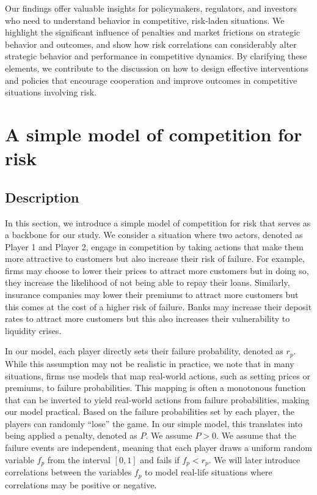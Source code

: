 \documentclass[preprint,12pt,authoryear]{elsarticle}
\theoremstyle{definition}
\begin{document}
Our findings offer valuable insights for policymakers, regulators, and investors who need to understand behavior in competitive, risk-laden situations. We highlight the significant influence of penalties and market frictions on strategic behavior and outcomes, and show how risk correlations can considerably alter strategic behavior and performance in competitive dynamics. By clarifying these elements, we contribute to the discussion on how to design effective interventions and policies that encourage cooperation and improve outcomes in competitive situations involving risk.

\section{A simple model of competition for risk}
\label{sec:simplemodel}
\subsection{Description}

In this section, we introduce a simple model of competition for risk that serves as a backbone for our study. We consider a situation where two actors, denoted as Player 1 and Player 2, engage in competition by taking actions that make them more attractive to customers but also increase their risk of failure. For example, firms may choose to lower their prices to attract more customers but in doing so, they increase the likelihood of not being able to repay their loans. Similarly, insurance companies may lower their premiums to attract more customers but this comes at the cost of a higher risk of failure. Banks may increase their deposit rates to attract more customers but this also increases their vulnerability to liquidity crises.

In our model, each player directly sets their failure probability, denoted as $r_p$. While this assumption may not be realistic in practice, we note that in many situations, firms use models that map real-world actions, such as setting prices or premiums, to failure probabilities. This mapping is often a monotonous function that can be inverted to yield real-world actions from failure probabilities, making our model practical.
Based on the failure probabilities set by each player, the players can randomly ``lose'' the game. In our simple model, this translates into being applied a penalty, denoted as $P$. We assume $P>0$. We assume that the failure events are independent, meaning that each player draws a uniform random variable $f_p$ from the interval $[0,1]$ and fails if $f_p < r_p$. We will later introduce correlations between the variables $f_p$ to model real-life situations where correlations may be positive or negative.
\end{document}
